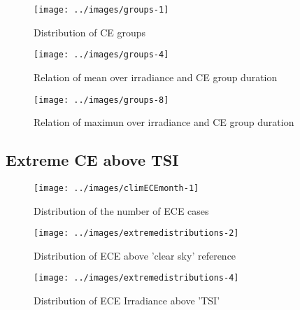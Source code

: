 \documentclass[
]{article}
\begin{document}
\begin{figure}[h!]

{\centering \texttt{[image: ../images/groups-1]} 

}

\caption{Distribution of CE groups}\label{fig:unnamed-chunk-7}
\end{figure}

\begin{figure}[h!]

{\centering \texttt{[image: ../images/groups-4]} 

}

\caption{Relation of mean over irradiance and CE group duration}\label{fig:unnamed-chunk-8}
\end{figure}

\begin{figure}[h!]

{\centering \texttt{[image: ../images/groups-8]} 

}

\caption{Relation of maximun over irradiance and CE group duration}\label{fig:unnamed-chunk-9}
\end{figure}

\FloatBarrier

\hypertarget{extreme-ce-above-tsi}{%
\subsection{Extreme CE above TSI}\label{extreme-ce-above-tsi}}

\begin{figure}[h!]

{\centering \texttt{[image: ../images/climECEmonth-1]} 

}

\caption{Distribution of the number of ECE cases}\label{fig:unnamed-chunk-10}
\end{figure}

\begin{figure}[h!]

{\centering \texttt{[image: ../images/extremedistributions-2]} 

}

\caption{Distribution of ECE above 'clear sky' reference}\label{fig:unnamed-chunk-11}
\end{figure}

\begin{figure}[h!]

{\centering \texttt{[image: ../images/extremedistributions-4]} 

}

\caption{Distribution of ECE Irradiance above 'TSI'}\label{fig:unnamed-chunk-12}
\end{figure}
\end{document}
